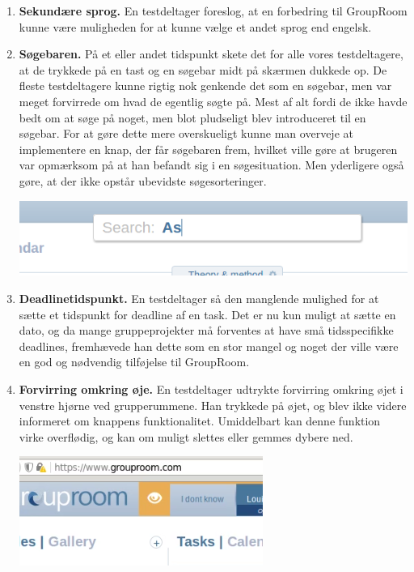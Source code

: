 \documentclass[12pt]{article}
\begin{document}
\begin{enumerate}
  \item \textbf{Sekundære sprog.} En testdeltager foreslog, at en forbedring til GroupRoom kunne være muligheden for at kunne vælge et andet sprog end engelsk.
    
  \item \textbf{Søgebaren.} På et eller andet tidspunkt skete det for alle vores testdeltagere, at de trykkede på en tast og en søgebar midt på skærmen dukkede op. De fleste testdeltagere kunne rigtig nok genkende det som en søgebar, men var meget forvirrede om hvad de egentlig søgte på. Mest af alt fordi de ikke havde bedt om at søge på noget, men blot pludseligt blev introduceret til en søgebar. For at gøre dette mere overskueligt kunne man overveje at implementere en knap, der får søgebaren frem, hvilket ville gøre at brugeren var opmærksom på at han befandt sig i en søgesituation. Men yderligere også gøre, at der ikke opstår ubevidste søgesorteringer.  
 
      \begin{center}\includegraphics[scale=0.4]{Billeder/search}\end{center}


  \item \textbf{Deadlinetidspunkt.} En testdeltager så den manglende mulighed for at sætte et tidspunkt for deadline af en task. Det er nu kun muligt at sætte en dato, og da mange gruppeprojekter må forventes at have små tidsspecifikke deadlines, fremhævede han dette som en stor mangel og noget der ville være en god og nødvendig tilføjelse til GroupRoom.

  \item \textbf{Forvirring omkring øje.} En testdeltager udtrykte forvirring omkring øjet i venstre hjørne ved grupperummene. Han trykkede på øjet, og blev ikke videre informeret om knappens funktionalitet. Umiddelbart kan denne funktion virke overflødig, og kan om muligt slettes eller gemmes dybere ned.
  
      \begin{center}\includegraphics[scale=0.6]{Billeder/eye}\end{center}



\end{enumerate}
\end{document}

